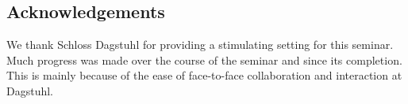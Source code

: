 \documentclass{sig-alternate-05-2015}
\begin{document}
\subsection*{Acknowledgements}
We thank Schloss Dagstuhl for providing a stimulating setting for this seminar. Much
progress was made over the course of the seminar and since its completion. This is mainly
because of the ease of face-to-face collaboration and interaction at Dagstuhl.

\begin{comment}
Furthermore, we thank all participants for fruitful \emph{and} open discussions
on very urgent challenges. The following people attend Dagstuhl Seminar 16251:
    Bengt Ahlgren (Swedish Institute of Computer Science, SE),
    Tohru Asami (University of Tokyo, JP),
    Roland Bless (Karlsruher Institut f\"ur Technologie, DE),
    Randy Bush (Internet Initiative Japan Inc., Tokyo, JP),
    Kenneth L. Calvert (University of Kentucky, Lexington, US),
    Antonio Carzaniga (University of Lugano, CH),
    Mauro Conti (University of Padova, IT),
    Lars Eggert (NetApp Deutschland GmbH, Kirchheim, DE),
    Darleen Fisher (NSF, Arlington, US),
    Ashish Gehani (SRI, Menlo Park, US),
    Jussi Kangasharju (University of Helsinki, FI),
    Ghassan Kar\-ame (NEC Laboratories Europe, Heidelberg, DE),
    Dirk Kut\-scher (NEC Laboratories Europe, Heidelberg, DE),
    John Mattsson (Ericsson Research, Stockholm, SE),
    Marc Mosko (Xerox PARC, Palo Alto, US),
    Edith Ngai (Uppsala University, SE),
    B\"orje Ohlman (Ericsson Research, Stockholm, SE),
    J\"org Ott (TU M\"unchen, DE),
    Craig Partridge (BBN Technologies, Cambridge, US),
    Fabio Pianese (Bell Labs, Nozay, FR),
    Sanjiva Prasad (Indian Inst. of Technology, Dehli, IN),
    Thomas C. Schmidt (HAW Hamburg, Hamburg, DE),
    Sebastian Sch�nberg (Intel, Santa Clara, US),
    Christoph Schuba (Ericsson, San Jose, US),
    Glenn Scott (Xerox PARC, Palo Alto, US),
    Jan Seedorf (NEC Laboratories Europe, Heidelberg \& Hochschule f\"ur Technik Stuttgart, DE),
    Tim Strayer (BBN Technologies, Cambridge, US),
    Christian Tschudin (Universit\"at Basel, CH),
    Gene Tsudik (University of California, Irvine, US),
    Ersin Uzun (Xerox PARC, Palo Alto, US),
    Matthias W\"ahlisch (FU Berlin, DE),
    Cedric Westphal (Huawei Technologies, Santa Clara, US),
    Christopher A. Wood (University of California, Irvine, US).
\end{comment}

\balance


\end{document}
